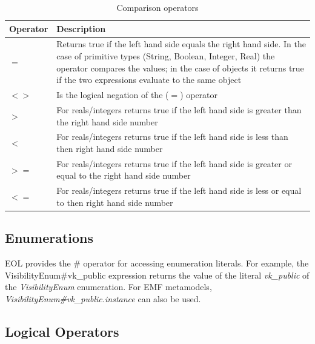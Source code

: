 \begin{longtable} {|p{5.5cm}|p{6.5cm}|}
			
			\caption{Comparison operators}
			\label{tab:ComparisonOperators}\\
			
			\hline
							
			\textbf{Operator} & \textbf{Description} \\\hline

			$=$ & Returns true if the left hand side equals the right hand side. In the case of primitive types (String, Boolean, Integer, Real) the operator compares the values; in the case of objects it returns true if the two expressions evaluate to the same object \\\hline
			
			$<>$ & Is the logical negation of the ($=$) operator \\\hline
				
			$>$ & For reals/integers returns true if the left hand side is greater than the right hand side number \\\hline
			
			$<$ & For reals/integers returns true if the left hand side is less than then right hand side number \\\hline
			
			$>=$ & For reals/integers returns true if the left hand side is greater or equal to the right hand side number \\\hline
			
			$<=$ & For reals/integers returns true if the left hand side is less or equal to then right hand side number \\\hline
		
\end{longtable}

\subsection{Enumerations}

EOL provides the \# operator for accessing enumeration literals. For example, the VisibilityEnum\#vk\_public expression returns the value of the literal \emph{vk\_public} of the \emph{VisibilityEnum} enumeration. For EMF metamodels, \emph{VisibilityEnum\#vk\_public.instance} can also be used.

\subsection{Logical Operators}

